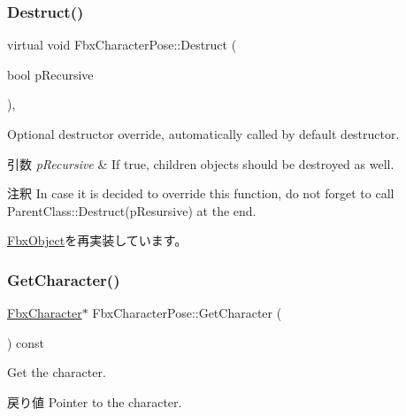 \mbox{\label{class_fbx_character_pose_a81243ac4049bf44a94dcfee8639a03f0}} 
\subsubsection{\texorpdfstring{Destruct()}{Destruct()}}
{\footnotesize\ttfamily virtual void Fbx\+Character\+Pose\+::\+Destruct (\begin{DoxyParamCaption}\item[{bool}]{p\+Recursive }\end{DoxyParamCaption})\hspace{0.3cm}{\ttfamily [protected]}, {\ttfamily [virtual]}}

Optional destructor override, automatically called by default destructor. 
\begin{DoxyParams}{引数}
{\em p\+Recursive} & If true, children objects should be destroyed as well. \\
\hline
\end{DoxyParams}
\begin{DoxyRemark}{注釈}
In case it is decided to override this function, do not forget to call Parent\+Class\+::\+Destruct(p\+Resursive) at the end. 
\end{DoxyRemark}


\hyperlink{class_fbx_object_a123e084d9b32b29c28af6384b7c3c608}{Fbx\+Object}を再実装しています。

\mbox{\label{class_fbx_character_pose_ac0429f7f15902a3eeb0c50e890529cde}} 
\subsubsection{\texorpdfstring{Get\+Character()}{GetCharacter()}}
{\footnotesize\ttfamily \hyperlink{class_fbx_character}{Fbx\+Character}$\ast$ Fbx\+Character\+Pose\+::\+Get\+Character (\begin{DoxyParamCaption}{ }\end{DoxyParamCaption}) const}

Get the character. \begin{DoxyReturn}{戻り値}
Pointer to the character. 
\end{DoxyReturn}
\mbox{\label{class_fbx_character_pose_abe05a6239a8a3e436a3e4d28ccde5499}} 
